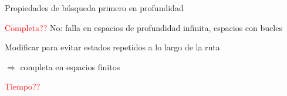 \begin{frame}{Propiedades de búsqueda primero en profundidad}

  
    \textcolor{red}{Completa??} No: falla en espacios de profundidad infinita, espacios con bucles
    
    \quad \quad \quad Modificar para evitar estados repetidos a lo largo de la ruta
    
    \quad \quad \quad \quad \quad $\Rightarrow$ completa en espacios finitos
    \bigskip
    
    \textcolor{red}{Tiempo??}
    
\end{frame}